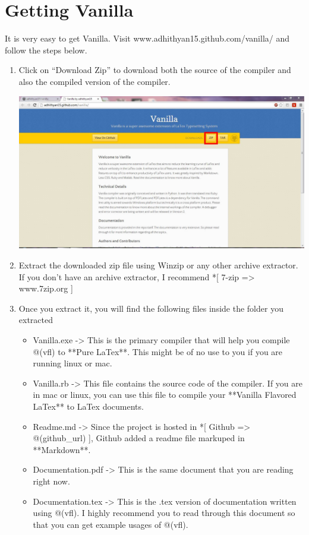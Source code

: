 \documentclass{article}
\begin{document}
\section*{Getting Vanilla}

It is very easy to get Vanilla. Visit www.adhithyan15.github.com/vanilla/ and follow the steps below. 

\begin{enumerate}

\item Click on ``Download Zip'' to download both the source of the compiler and also the compiled version of the compiler. \vspace{5pt}

\includegraphics[scale=0.5]{VanillaGithub}

\item Extract the downloaded zip file using Winzip or any other archive extractor. If you don't have an archive extractor, I recommend *[ 7-zip => www.7zip.org ]

\item Once you extract it, you will find the following files inside the folder you extracted

\begin{itemize}

\item Vanilla.exe  -> This is the primary compiler that will help you compile @(vfl) to **Pure LaTex**. This might be of no use to you if you are running linux or mac. 
\item Vanilla.rb  ->  This file contains the source code of the compiler. If you are in mac or linux, you can use this file to compile your **Vanilla Flavored LaTex** to LaTex documents.
\item Readme.md ->  Since the project is hosted in *[ Github => @(github_url) ], Github added a readme file markuped in **Markdown**.
\item Documentation.pdf ->  This is the same document that you are reading right now. 
\item Documentation.tex ->  This is the .tex version of documentation written using @(vfl). I highly recommend you to read through this document so that you can get example usages of @(vfl). 


\end{itemize}
\end{enumerate}
\end{document}
